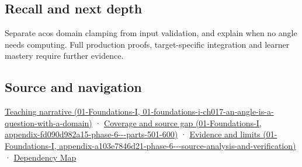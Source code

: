 \subsection{Recall and next depth}\label{appendix-e569e60e18e6-recall-and-next-depth}

Separate acos domain clamping from input validation, and explain when no angle needs computing. Full production proofs, target-specific integration and learner mastery require further evidence.

\subsection{Source and navigation}\label{appendix-e569e60e18e6-source-and-navigation}

\href{../01-Foundations-I/main.pdf\#nameddest=01-foundations-i-ch017-an-angle-is-a-question-with-a-domain}{Teaching narrative (01-Foundations-I, 01-foundations-i-ch017-an-angle-is-a-question-with-a-domain)} · \href{../01-Foundations-I/main.pdf\#nameddest=appendix-fd090d982a15-phase-6---parts-501-600}{Coverage and source gap (01-Foundations-I, appendix-fd090d982a15-phase-6-\/-\/-parts-501-600)} · \href{../01-Foundations-I/main.pdf\#nameddest=appendix-a103e7846d21-phase-6---source-analysis-and-verification}{Evidence and limits (01-Foundations-I, appendix-a103e7846d21-phase-6-\/-\/-source-analysis-and-verification)} · \hyperref[appendix-4ad47bdd269a]{Dependency Map}
